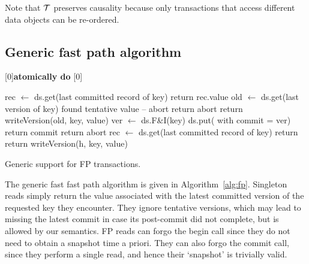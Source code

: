 Note that  ${\cal T}$  preserves causality because 
only transactions that  access different data objects can be re-ordered.


\subsection{Generic fast path algorithm}
\label{ssec:fast-algorithm}



\begin{algorithm}[htb]
[0]{{\bf atomically do}}
[0]{}
\begin{algorithmic}
\small
{}
\State rec  $\leftarrow$ ds.get(last committed record of key) 
\State  return rec.value
\EndProcedure
%
\Statex
{} 
	\State old $\leftarrow$ ds.get(last version of key)
	  \Comment found tentative value -- abort 
		\State return abort 
	\EndIf
	\State return {\sc writeVersion}(old, key, value)
\EndProcedure
%
\Statex
{} 
\Atomic 
	\State ver $\leftarrow$ ds.F\&I(key)  
	\State ds.put( with commit = ver)  
	\State return commit
	\Else \State return abort \EndIf
\EndAtomic
\EndProcedure
{}
\State rec  $\leftarrow$ ds.get(last committed record of key) 
\State  return 
\EndProcedure
\Statex
{} 
\State return {\sc writeVersion}(h, key, value)
\EndProcedure

\end{algorithmic}
\caption{Generic support for FP transactions.}
\label{alg:fp}
\end{algorithm}

The generic fast fast path algorithm is given in Algorithm~\ref{alg:fp}. 
%
Singleton reads simply return the value associated with the  latest committed version of the requested key they encounter.  
They ignore tentative versions, which may lead to missing the latest commit in case its post-commit did not complete, 
but is allowed by our semantics. 
FP reads can forgo the begin call since they do not need to obtain a snapshot time a priori. 
They can also forgo the commit call, since they perform a single read, and hence their `snapshot' is trivially valid.

